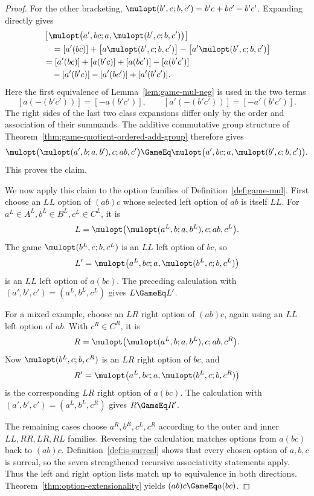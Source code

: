 \begin{proof}
  For the other bracketing,
  \(\mulopt(b',c;b,c')=b'c+bc'-b'c'\).  Expanding directly gives
  \[
    \begin{aligned}
      &\left[
        \mulopt\bigl(a',bc;a,\mulopt(b',c;b,c')\bigr)
      \right]\\
      &\quad=[a'(bc)]
        +\bigl[a\mulopt(b',c;b,c')\bigr]
        -\bigl[a'\mulopt(b',c;b,c')\bigr]\\
        &=[a'(bc)]+[a(b'c)]+[a(bc')]-[a(b'c')]\\
        &\quad-[a'(b'c)]-[a'(bc')]+[a'(b'c')].
    \end{aligned}
  \]
  Here the first equivalence of Lemma~\ref{lem:game-mul-neg} is used in the
  two terms
  \[
    [a(-(b'c'))]=[-a(b'c')],
    \qquad
    [a'(-(b'c'))]=[-a'(b'c')].
  \]
  The right sides of the last two class expansions differ only by the order
  and association of their summands.  The additive commutative group structure
  of Theorem~\ref{thm:game-quotient-ordered-add-group} therefore gives
  \[
    \mulopt\bigl(\mulopt(a',b;a,b'),c;ab,c'\bigr)
      \GameEq
    \mulopt\bigl(a',bc;a,\mulopt(b',c;b,c')\bigr).
  \]
  This proves the claim.

  We now apply this claim to the option families of
  Definition~\ref{def:game-mul}.  First choose an \(LL\) option of \((ab)c\)
  whose selected left option of \(ab\) is itself \(LL\).  For
  \(a^L\in A^L,b^L\in B^L,c^L\in C^L\), it is
  \[
    L=\mulopt\bigl(\mulopt(a^L,b;a,b^L),c;ab,c^L\bigr).
  \]
  The game \(\mulopt(b^L,c;b,c^L)\) is an \(LL\) left option of \(bc\), so
  \[
    L'=\mulopt\bigl(a^L,bc;a,\mulopt(b^L,c;b,c^L)\bigr)
  \]
  is an \(LL\) left option of \(a(bc)\).  The preceding calculation with
  \((a',b',c')=(a^L,b^L,c^L)\) gives \(L\GameEq L'\).

  For a mixed example, choose an \(LR\) right option of \((ab)c\), again
  using an \(LL\) left option of \(ab\).  With \(c^R\in C^R\), it is
  \[
    R=\mulopt\bigl(\mulopt(a^L,b;a,b^L),c;ab,c^R\bigr).
  \]
  Now \(\mulopt(b^L,c;b,c^R)\) is an \(LR\) right option of \(bc\), and
  \[
    R'=\mulopt\bigl(a^L,bc;a,\mulopt(b^L,c;b,c^R)\bigr)
  \]
  is the corresponding \(LR\) right option of \(a(bc)\).  The calculation
  with \((a',b',c')=(a^L,b^L,c^R)\) gives \(R\GameEq R'\).

  The remaining cases choose \(a^R,b^R,c^L,c^R\) according to the outer and
  inner \(LL,RR,LR,RL\) families.  Reversing the calculation matches options
  from \(a(bc)\) back to \((ab)c\).  Definition~\ref{def:is-surreal} shows
  that every chosen option of \(a,b,c\) is surreal, so the seven strengthened
  recursive associativity statements apply.  Thus the left and right option
  lists match up to equivalence in both directions.
  Theorem~\ref{thm:option-extensionality} yields
  \((ab)c\GameEq a(bc)\).
\end{proof}


